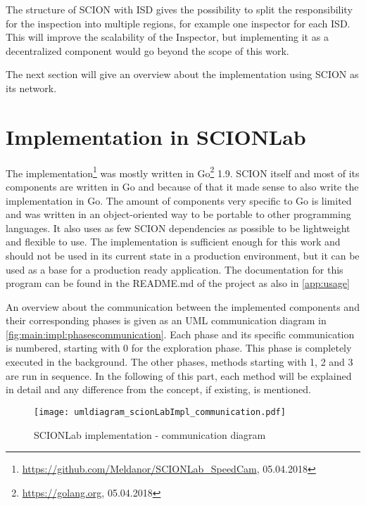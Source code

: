 \documentclass[thesis.tex]{subfiles}
\begin{document}
The structure of SCION with ISD gives the possibility to split the responsibility for the inspection into multiple regions, for example one inspector for each ISD. This will improve the scalability of the Inspector, but implementing it as a decentralized component would go beyond the scope of this work.

The next section will give an overview about the implementation using SCION as its network.

\section{Implementation in SCIONLab} \label{sec:main:scionlabimpl}

The implementation\footnote{\url{https://github.com/Meldanor/SCIONLab_SpeedCam}, 05.04.2018} was mostly written in Go\footnote{\url{https://golang.org}, 05.04.2018} 1.9. SCION itself and most of its components are written in Go and because of that it made sense to also write the implementation in Go. The amount of components very specific to Go is limited and was written in an object-oriented way to be portable to other programming languages. It also uses as few SCION dependencies as possible to be lightweight and flexible to use. The implementation is sufficient enough for this work and should not be used in its current state in a production environment, but it can be used as a base for a production ready application. The documentation for this program can be found in the README.md of the project as also in \autoref{app:usage}

An overview about the communication between the implemented components and their corresponding phases is given as an UML communication diagram in \autoref{fig:main:impl:phasescommunication}. Each phase and its specific communication is numbered, starting with 0 for the exploration phase. This phase is completely executed in the background. The other phases, methods starting with 1, 2 and 3 are run in sequence. In the following of this part, each method will be explained in detail and any difference from the concept, if existing, is mentioned.

\begin{figure}
	\centering
	\texttt{[image: umldiagram\_scionLabImpl\_communication.pdf]}
	\caption{SCIONLab implementation - communication diagram}
	\label{fig:main:impl:phasescommunication}
\end{figure}
\end{document}

